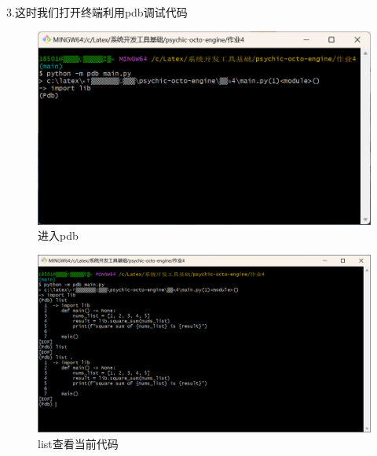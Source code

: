 \documentclass{ctexart}
\begin{document}
\begin{enumerate}
    3.这时我们打开终端利用pdb调试代码
    \begin{figure}[H]
        \centering
        \includegraphics[width=14cm]{41d20ae257a69833fa1bf95d063eccf2.png}
        \caption{进入pdb}
        \label{fig:8}
        \end{figure}   
        \begin{figure}[H]
            \centering
            \includegraphics[width=14cm]{c7df9f2deb01459227251338902c74f6.png}
            \caption{list查看当前代码}
            \label{fig:9}
            \end{figure}   


\end{enumerate}
\end{document}
